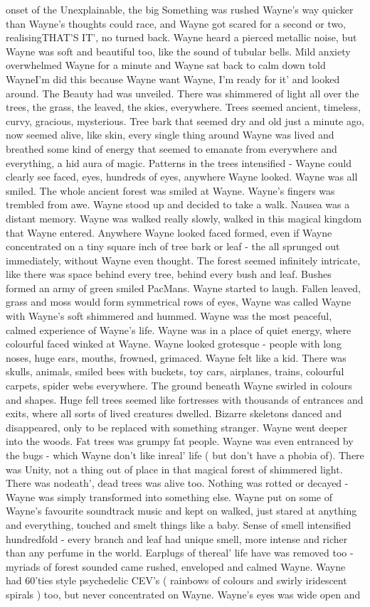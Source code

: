 \documentclass[12pt]{book}
\begin{document}
onset of the Unexplainable, the big Something was rushed Wayne's way quicker than Wayne's thoughts could race, and Wayne got scared for a second or two, realisingTHAT'S IT', no turned back. Wayne heard a pierced metallic noise, but Wayne was soft and beautiful too, like the sound of tubular bells. Mild anxiety overwhelmed Wayne for a minute and Wayne sat back to calm down told WayneI'm did this because Wayne want Wayne, I'm ready for it' and looked around. The Beauty had was unveiled. There was shimmered of light all over the trees, the grass, the leaved, the skies, everywhere. Trees seemed ancient, timeless, curvy, gracious, mysterious. Tree bark that seemed dry and old just a minute ago, now seemed alive, like skin, every single thing around Wayne was lived and breathed some kind of energy that seemed to emanate from everywhere and everything, a hid aura of magic. Patterns in the trees intensified - Wayne could clearly see faced, eyes, hundreds of eyes, anywhere Wayne looked. Wayne was all smiled. The whole ancient forest was smiled at Wayne. Wayne's fingers was trembled from awe. Wayne stood up and decided to take a walk. Nausea was a distant memory. Wayne was walked really slowly, walked in this magical kingdom that Wayne entered. Anywhere Wayne looked faced formed, even if Wayne concentrated on a tiny square inch of tree bark or leaf - the all sprunged out immediately, without Wayne even thought. The forest seemed infinitely intricate, like there was space behind every tree, behind every bush and leaf. Bushes formed an army of green smiled PacMans. Wayne started to laugh. Fallen leaved, grass and moss would form symmetrical rows of eyes, Wayne was called Wayne with Wayne's soft shimmered and hummed. Wayne was the most peaceful, calmed experience of Wayne's life. Wayne was in a place of quiet energy, where colourful faced winked at Wayne. Wayne looked grotesque - people with long noses, huge ears, mouths, frowned, grimaced. Wayne felt like a kid. There was skulls, animals, smiled bees with buckets, toy cars, airplanes, trains, colourful carpets, spider webs everywhere. The ground beneath Wayne swirled in colours and shapes. Huge fell trees seemed like fortresses with thousands of entrances and exits, where all sorts of lived creatures dwelled. Bizarre skeletons danced and disappeared, only to be replaced with something stranger. Wayne went deeper into the woods. Fat trees was grumpy fat people. Wayne was even entranced by the bugs - which Wayne don't like inreal' life ( but don't have a phobia of). There was Unity, not a thing out of place in that magical forest of shimmered light. There was nodeath', dead trees was alive too. Nothing was rotted or decayed - Wayne was simply transformed into something else. Wayne put on some of Wayne's favourite soundtrack music and kept on walked, just stared at anything and everything, touched and smelt things like a baby. Sense of smell intensified hundredfold - every branch and leaf had unique smell, more intense and richer than any perfume in the world. Earplugs of thereal' life have was removed too - myriads of forest sounded came rushed, enveloped and calmed Wayne. Wayne had 60'ties style psychedelic CEV's ( rainbows of colours and swirly iridescent spirals ) too, but never concentrated on Wayne. Wayne's eyes was wide open and 
\end{document}

